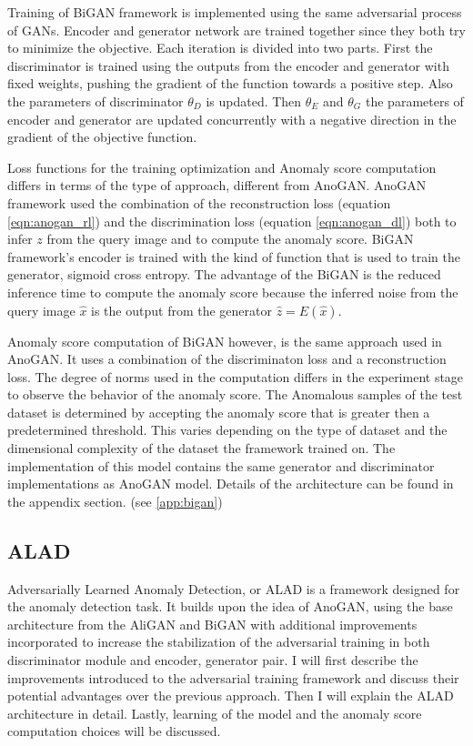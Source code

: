 Training of BiGAN framework is implemented using the same adversarial process of GANs. Encoder and
generator network are trained together since they both try to minimize the objective. Each iteration
is divided into two parts. First the discriminator is trained using the outputs from the encoder and
generator with fixed weights, pushing the gradient of the function towards a positive step. Also the
parameters of discriminator $\theta_D$ is updated. Then $\theta_E$ and $\theta_G$ the parameters of
encoder and generator are updated concurrently with a negative direction in the gradient of the
objective function. \cite{Donahue2017AdversarialFL}

Loss functions for the training optimization and Anomaly score computation differs in terms of the
type of approach, different from AnoGAN\cite{Schlegl2017UnsupervisedAD}. AnoGAN framework used the
combination of the reconstruction loss (equation \ref{eqn:anogan_rl}) and the discrimination loss
(equation \ref{eqn:anogan_dl}) both to infer $z$ from the query image and to compute the anomaly
score. BiGAN framework's encoder is trained with the kind of function that is used to train the
generator, sigmoid cross entropy. The advantage of the BiGAN is the reduced inference time to
compute the anomaly score because the inferred noise from the query image $\hat{x}$ is the output
from the generator $\hat{z} = E(\hat{x})$. 

Anomaly score computation of BiGAN however, is the same approach used in AnoGAN. It uses a
combination of the discriminaton loss and a reconstruction loss. The degree of norms used in the
computation differs in the experiment stage to observe the behavior of the anomaly score. The
Anomalous samples of the test dataset is determined by accepting the anomaly score that is greater
then a predetermined threshold. This varies depending on the type of dataset and the dimensional
complexity of the dataset the framework trained on.
The implementation of this model contains the same generator and discriminator implementations as AnoGAN model.
Details of the architecture can be found in the appendix section. (see \ref{app:bigan})


\subsection{ALAD}
\label{sec:alad}

Adversarially Learned Anomaly Detection, or ALAD \cite{DBLP:journals/corr/abs-1812-02288} is a
framework designed for the anomaly detection task. It builds upon the idea of AnoGAN, using the base
architecture from the AliGAN and BiGAN with additional improvements incorporated to increase the
stabilization of the adversarial training in both  discriminator module and encoder, generator pair.
I will first describe the improvements introduced to the adversarial training framework and discuss
their potential advantages over the previous approach. Then I will explain the ALAD architecture in
detail. Lastly, learning of the model and the anomaly score computation choices will be discussed. 

